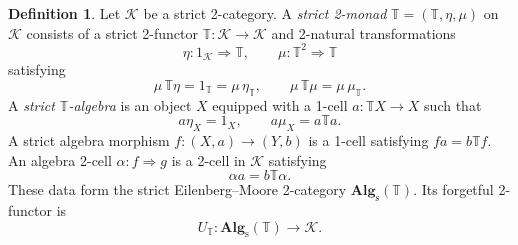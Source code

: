\documentclass[11pt]{article}
\theoremstyle{plain}
\theoremstyle{definition}
\newtheorem{definition}[theorem]{Definition}
\theoremstyle{remark}
\newcommand{\Alg}{\mathbf{Alg}_{\mathrm{s}}}
\numberwithin{equation}{section}
\begin{document}
\begin{definition}\label{def:strict-em}
Let $\mathcal K$ be a strict 2-category.  A \emph{strict 2-monad}
$\mathbb T=(\mathbb T,\eta,\mu)$ on $\mathcal K$ consists of a strict
2-functor $\mathbb T\colon\mathcal K\to\mathcal K$ and 2-natural
transformations
\begin{equation*}
  \eta\colon1_{\mathcal K}\Rightarrow\mathbb T,
  \qquad
  \mu\colon\mathbb T^2\Rightarrow\mathbb T
\end{equation*}
satisfying
\begin{equation*}
  \mu\,\mathbb T\eta=1_{\mathbb T}
  =\mu\,\eta_{\mathbb T},
  \qquad
  \mu\,\mathbb T\mu=\mu\,\mu_{\mathbb T}.
\end{equation*}
A \emph{strict $\mathbb T$-algebra} is an object $X$ equipped with a
1-cell $a\colon\mathbb T X\to X$ such that
\begin{equation*}
  a\eta_X=1_X,
  \qquad
  a\mu_X=a\mathbb T a.
\end{equation*}
A strict algebra morphism
$f\colon(X,a)\to(Y,b)$ is a 1-cell satisfying
$fa=b\mathbb T f$.  An algebra 2-cell
$\alpha\colon f\Rightarrow g$ is a 2-cell in $\mathcal K$ satisfying
\begin{equation*}
  \alpha a=b\mathbb T\alpha.
\end{equation*}
These data form the strict Eilenberg--Moore 2-category
$\Alg(\mathbb T)$.  Its forgetful 2-functor is
\begin{equation*}
  U_{\mathbb T}\colon\Alg(\mathbb T)\longrightarrow\mathcal K.
\end{equation*}
\end{definition}
\end{document}
